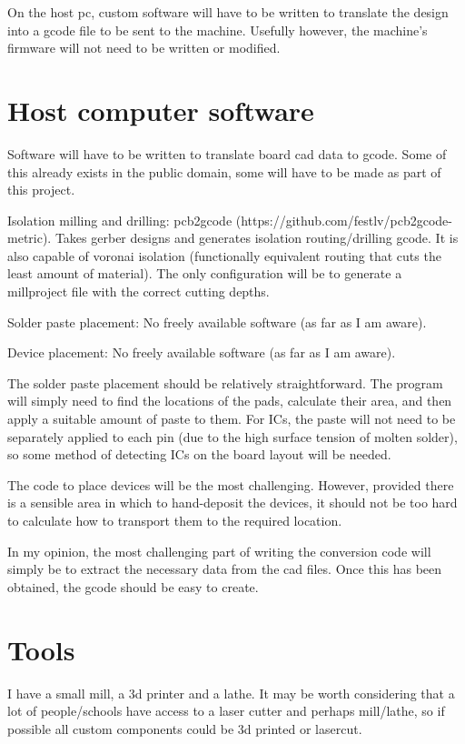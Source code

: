 \documentclass[a4paper,11pt]{article}  %
\begin{document}
On the host pc, custom software will have to be written to translate the design into a gcode file to be sent to the machine. Usefully however,
the machine's firmware will not need to be written or modified.

\section{Host computer software}
Software will have to be written to translate board cad data to gcode. Some of this already exists in the public domain, some will have to be made
as part of this project.

Isolation milling and drilling: pcb2gcode (https://github.com/festlv/pcb2gcode-metric). Takes gerber designs and generates isolation routing/drilling
gcode. It is also capable of voronai isolation (functionally equivalent routing that cuts the least amount of material). The only configuration
will be to generate a millproject file with the correct cutting depths.

Solder paste placement: No freely available software (as far as I am aware).

Device placement: No freely available software (as far as I am aware).

The solder paste placement should be relatively straightforward. The program will simply need to find the locations of the pads, calculate their
area, and then apply a suitable amount of paste to them. For ICs, the paste will not need to be separately applied to each pin (due to the high
surface tension of molten solder), so some method of detecting ICs on the board layout will be needed.

The code to place devices will be the most challenging. However, provided there is a sensible area in which to hand-deposit the devices, it should
not be too hard to calculate how to transport them to the required location.

In my opinion, the most challenging part of writing the conversion code will simply be to extract the necessary data from the cad files. Once this
has been obtained, the gcode should be easy to create.

\section{Tools}
I have a small mill, a 3d printer and a lathe. It may be worth considering that a lot of people/schools have
access to a laser cutter and perhaps mill/lathe, so if possible all custom components could be 3d printed or 
lasercut.
\end{document}
